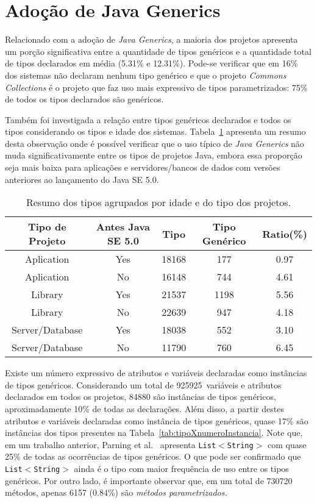 
\section{Adoção de Java Generics}
Relacionado com a adoção de \textit{Java Generics}, a maioria dos projetos apresenta um porção significativa entre a quantidade de tipos genéricos e a quantidade total de tipos declarados em média (5.31\% e 12.31\%). Pode-se verificar que em 16\% dos sistemas não declaram nenhum tipo genérico e que o projeto \textit{Commons Collections} é o projeto que faz uso 
mais expressivo de tipos parametrizados: 
75\% de todos os tipos declarados são genéricos.

Também foi investigada a relação entre tipos genéricos declarados e todos os tipos considerando os tipos e idade dos sistemas. Tabela~\ref{tab:std} apresenta um resumo desta observação onde é possível verificar que o uso típico de \textit{Java Generics} não muda significativamente entre os tipos de projetos Java, embora essa proporção seja mais baixa para aplicações e servidores/bancos de dados com versões anteriores ao lançamento do Java SE 5.0.

\begin{table}[h!]
	\centering
	\caption{Resumo dos tipos agrupados por idade e do tipo dos projetos.}
	\begin{tabular}{ccccc} \hline 
		Tipo de Projeto & Antes Java SE 5.0 & Tipo & Tipo Genérico & Ratio(\%) \\ \hline\hline
		Aplication & Yes & 18168 & 177 & 0.97 \\
		Aplication & No & 16148 & 744 & 4.61 \\
		Library & Yes & 21537 & 1198 & 5.56 \\
		Library & No & 22639 & 947 & 4.18 \\
		Server/Database & Yes & 18038 & 552 & 3.10 \\ 
		Server/Database & No & 11790 & 760 & 6.45 \\ \hline
	\end{tabular}
	\label{tab:std} %
\end{table}


Existe um número expressivo de atributos e variáveis declaradas como instâncias de tipos genéricos. Considerando um total de \num{925925}\ variáveis e atributos declarados em todos os projetos, \num{84880} são instâncias de tipos genéricos, aproximadamente 10\% de todas as declarações. Além disso, a partir destes atributos e variáveis declaradas como instância de tipos genéricos, quase 17\% são instâncias dos tipos presentes na Tabela~\ref{tab:tipoXnumeroInstancia}. Note que, em um trabalho anterior, Parning et al.~\cite{Parnin:ACM2011} apresenta \texttt{List$<$String$>$} com quase 25\% de todas as ocorr\^{e}ncias 
de tipos genéricos. O que pode ser confirmado que \texttt{List$<$String$>$} ainda é o tipo com maior frequência de uso entre os tipos genéricos. 
Por outro lado, é importante observar que, em um total de 
\num{730720} métodos, apenas \num{6157} (0.84\%) 
são \emph{métodos parametrizados.}

